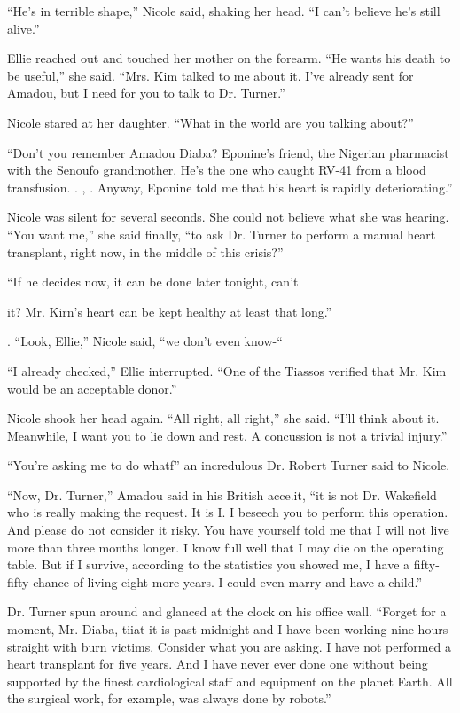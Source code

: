 \documentclass[]{article}
\begin{document}
{“He’s in terrible shape,” Nicole said, shaking her head.  “I can’t believe he’s still alive.”

Ellie reached out and touched her mother on the forearm.  “He wants his death to be useful,” she said.  “Mrs.  Kim talked to me about it.  I’ve already sent for Amadou, but I need for you to talk to Dr.  Turner.”

Nicole stared at her daughter.  “What in the world are you talking about?”

“Don’t you remember Amadou Diaba? Eponine’s friend, the Nigerian pharmacist with the Senoufo grandmother.  He’s the one who caught RV-41 from a blood transfusion.  .  , .  Anyway, Eponine told me that his heart is rapidly deteriorating.”

Nicole was silent for several seconds.  She could not believe what she was hearing.  “You want me,” she said finally, “to ask Dr.  Turner to perform a manual heart transplant, right now, in the middle of this crisis?”

“If he decides now, it can be done later tonight, can’t

it? Mr.  Kirn’s heart can be kept healthy at least that long.”

.  “Look, Ellie,” Nicole said, “we don’t even know-“

“I already checked,” Ellie interrupted.  “One of the Tiassos verified that Mr.  Kim would be an acceptable donor.”

Nicole shook her head again.  “All right, all right,” she said.  “I’ll think about it.  Meanwhile, I want you to lie down and rest.  A concussion is not a trivial injury.”

“You’re asking me to do whatf” an incredulous Dr.  Robert Turner said to Nicole.

“Now, Dr.  Turner,” Amadou said in his British acce.it, “it is not Dr.  Wakefield who is really making the request.  It is I.  I beseech you to perform this operation.  And please do not consider it risky.  You have yourself told me that I will not live more than three months longer.  I know full well that I may die on the operating table.  But if I survive, according to the statistics you showed me, I have a fifty-fifty chance of living eight more years.  I could even marry and have a child.”

Dr.  Turner spun around and glanced at the clock on his office wall.  “Forget for a moment, Mr.  Diaba, tiiat it is past midnight and I have been working nine hours straight with burn victims.  Consider what you are asking.  I have not performed a heart transplant for five years.  And I have never ever done one without being supported by the finest cardiological staff and equipment on the planet Earth.  All the surgical work, for example, was always done by robots.”

}
\end{document}
